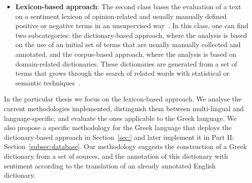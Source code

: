 \begin{itemize}
 \item \textbf{Lexicon-based approach}:
 The second class bases the evaluation of a text on a sentiment lexicon
 of opinion-related and usually manually defined positive or negative terms
 in an unsupervised way~\cite{SORH15,GSZ13,Tur02}.
 In this class, one can find two subcategories:
 the dictionary-based approach,
 where the analysis is based on the use of an initial set of terms
 that are usually manually collected and annotated,
 and the corpus-based approach, where the analysis is based
 on domain-related dictionaries.
 These dictionaries are generated from a set of terms
 that grows through the search of related words
 with statistical or semantic techniques~\cite{SORH15}.
 
\end{itemize}

In the particular thesis we focus on the lexicon-based approach.
We analyse the current methodologies implemented,
distinguish them between multi-lingual and language-specific,
and evaluate the ones applicable to the Greek language.
We also propose a specific methodology for the Greek language
that deploys the dictionary-based approach in Section~\ref{sec:} %
and later implement it in Part II: Section~\ref{subsec:database}.
Our methodology suggests the construction of a Greek dictionary
from a set of sources,
and the annotation of this dictionary with sentiment
according to the translation of an already annotated English dictionary.
